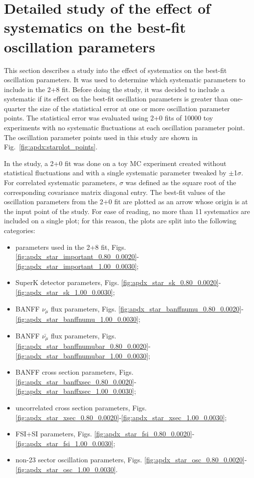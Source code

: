 \clearpage

\section{Detailed study of the effect of systematics on the best-fit oscillation parameters}
\label{appendix:systematics_bestfit_oscillations}


This section describes a study into the effect of systematics on the best-fit oscillation parameters.
It was used to determine which systematic parameters to include in the 2+8 fit. Before doing the study, it was decided to include a systematic 
if its effect on the best-fit oscillation parameters is greater than one-quarter the size of the statistical error at one or more oscillation 
parameter points. The statistical error was evaluated using 2+0 fits of 10000 toy experiments with no systematic fluctuations at each 
oscillation parameter point. The oscillation parameter points used in this study are shown in Fig.\ \ref{fig:apdx:starplot_points}.

In the study, a 2+0 fit was done on a toy MC experiment created without statistical fluctuations and with a single systematic parameter 
tweaked by $\pm$1$\sigma$.
For correlated systematic parameters, $\sigma$ was defined as the square root of the corresponding covariance matrix diagonal entry.
The best-fit values of the oscillation parameters from the 2+0 fit are plotted as an arrow whose origin is at the input point of the study.
For ease of reading, no more than 11 systematics are included on a single plot; for this reason, the plots are split into the following categories:
\begin{itemize}
\item parameters used in the 2+8 fit, Figs. \ref{fig:apdx_star_important_0.80_0.0020}-\ref{fig:apdx_star_important_1.00_0.0030};
\item SuperK detector parameters, Figs. \ref{fig:apdx_star_sk_0.80_0.0020}-\ref{fig:apdx_star_sk_1.00_0.0030};
\item BANFF $\nu_\mu$ flux parameters, Figs. \ref{fig:apdx_star_banffnumu_0.80_0.0020}-\ref{fig:apdx_star_banffnumu_1.00_0.0030};
\item BANFF $\bar{\nu_\mu}$ flux parameters, Figs. \ref{fig:apdx_star_banffnumubar_0.80_0.0020}-\ref{fig:apdx_star_banffnumubar_1.00_0.0030};
\item BANFF cross section parameters, Figs. \ref{fig:apdx_star_banffxsec_0.80_0.0020}-\ref{fig:apdx_star_banffxsec_1.00_0.0030};
\item uncorrelated cross section parameters, Figs. \ref{fig:apdx_star_xsec_0.80_0.0020}-\ref{fig:apdx_star_xsec_1.00_0.0030};
\item FSI+SI parameters, Figs. \ref{fig:apdx_star_fsi_0.80_0.0020}-\ref{fig:apdx_star_fsi_1.00_0.0030};
\item non-23 sector oscillation parameters, Figs. \ref{fig:apdx_star_osc_0.80_0.0020}-\ref{fig:apdx_star_osc_1.00_0.0030}.
\end{itemize}

